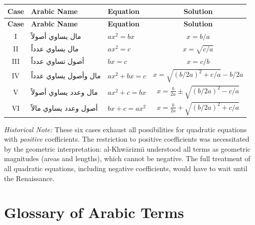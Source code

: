 \documentclass[11pt,a4paper]{book}
\newcommand{\cnote}[1]{\textcolor{notecolor}{\textit{#1}}}
\begin{document}
\begin{center}
\renewcommand{\arraystretch}{1.6}
\begin{longtable}{|c|l|l|c|}
\hline
\textbf{Case} & \textbf{Arabic Name} & \textbf{Equation} & \textbf{Solution} \\
\hline
\endfirsthead
\hline
\textbf{Case} & \textbf{Arabic Name} & \textbf{Equation} & \textbf{Solution} \\
\hline
\endhead
\hline
\endfoot
I & مال يساوي أصولاً & $ax^2 = bx$ & $x = b/a$ \\
\hline
II & مال يساوي عدداً & $ax^2 = c$ & $x = \sqrt{c/a}$ \\
\hline
III & أصول تساوي عدداً & $bx = c$ & $x = c/b$ \\
\hline
IV & مال وأصول يساوي عدداً & $ax^2 + bx = c$ & $x = \sqrt{(b/2a)^2 + c/a} - b/2a$ \\
\hline
V & مال وعدد يساوي أصولاً & $ax^2 + c = bx$ & $x = \frac{b}{2a} \pm \sqrt{(b/2a)^2 - c/a}$ \\
\hline
VI & أصول وعدد يساوي مالاً & $bx + c = ax^2$ & $x = \frac{b}{2a} + \sqrt{(b/2a)^2 + c/a}$ \\
\hline
\end{longtable}
\end{center}

\vspace{0.5cm}

\cnote{Historical Note:} These six cases exhaust all possibilities for
quadratic equations with \textit{positive} coefficients. The restriction to
positive coefficients was necessitated by the geometric interpretation:
al-Khw\=arizm\"{\i} understood all terms as geometric magnitudes (areas and
lengths), which cannot be negative. The full treatment of all quadratic
equations, including negative coefficients, would have to wait until the
Renaissance.

\chapter{Glossary of Arabic Terms}
\label{app:glossary}
\end{document}
